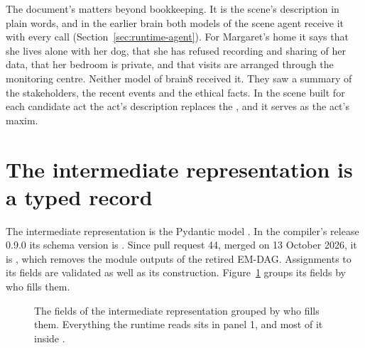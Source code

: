 The document's  matters beyond bookkeeping. It is the scene's description in plain
words, and in the earlier brain both models of the scene agent receive it with every call
(Section~\ref{sec:runtime-agent}). For Margaret's home it says that she lives alone with her dog,
that she has refused recording and sharing of her data, that her bedroom is private, and that visits
are arranged through the monitoring centre.
Neither model of brain8 received it. They saw a summary of the stakeholders, the recent
events and the ethical facts. In the scene built for each candidate act the act's description
replaces the , and it serves as the act's maxim.

\section{The intermediate representation is a typed record}\label{sec:erisml-ir}

The intermediate representation is the Pydantic model . In the compiler's release
0.9.0 its schema version is . Since pull request 44,
merged on 13 October 2026, it is , which removes the module outputs of the retired EM-DAG.
Assignments to its fields are validated as well as its construction.
Figure~\ref{fig:erisml-ir-anatomy} groups its fields by who fills them.

\begin{figure}[t]
\centering

\caption{The fields of the intermediate representation grouped by who fills them. Everything the
runtime reads sits in panel 1, and most of it inside .}
\label{fig:erisml-ir-anatomy}
\end{figure}

